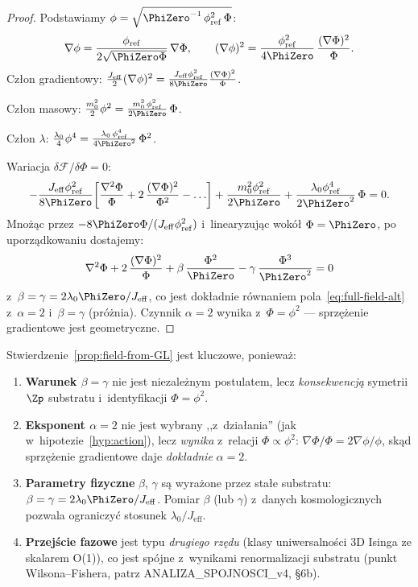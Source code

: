 \begin{proof}
Podstawiamy $\phi = \sqrt{\PhiZero^{-1}\,\phi_{\mathrm{ref}}^2\,\Phi}$:
\[
  \nabla\phi = \frac{\phi_{\mathrm{ref}}}{2\sqrt{\PhiZero\Phi}}\,\nabla\Phi,
  \qquad
  (\nabla\phi)^2 = \frac{\phi_{\mathrm{ref}}^2}{4\PhiZero}\,
    \frac{(\nabla\Phi)^2}{\Phi}.
\]
Cz\l{}on gradientowy:
$\frac{J_{\mathrm{eff}}}{2}(\nabla\phi)^2
= \frac{J_{\mathrm{eff}}\phi_{\mathrm{ref}}^2}{8\PhiZero}
  \frac{(\nabla\Phi)^2}{\Phi}$.

Cz\l{}on masowy:
$\frac{m_0^2}{2}\phi^2
= \frac{m_0^2\,\phi_{\mathrm{ref}}^2}{2\PhiZero}\,\Phi$.

Cz\l{}on $\lambda$:
$\frac{\lambda_0}{4}\phi^4
= \frac{\lambda_0\,\phi_{\mathrm{ref}}^4}{4\PhiZero^2}\,\Phi^2$.

Wariacja $\delta\mathcal{F}/\delta\Phi = 0$:
\[
  -\frac{J_{\mathrm{eff}}\phi_{\mathrm{ref}}^2}{8\PhiZero}\!\left[
    \frac{\nabla^2\Phi}{\Phi}
    + 2\,\frac{(\nabla\Phi)^2}{\Phi^2} - \ldots
  \right]
  + \frac{m_0^2\phi_{\mathrm{ref}}^2}{2\PhiZero}
  + \frac{\lambda_0\phi_{\mathrm{ref}}^4}{2\PhiZero^2}\,\Phi
  = 0.
\]
Mno\.z\k{a}c przez $-8\PhiZero\Phi/(J_{\mathrm{eff}}\phi_{\mathrm{ref}}^2)$
i~linearyzuj\k{a}c wok\'o\l{} $\Phi = \PhiZero$, po uporz\k{a}dkowaniu
dostajemy:
\[
  \nabla^2\Phi + 2\,\frac{(\nabla\Phi)^2}{\Phi}
  + \beta\,\frac{\Phi^2}{\PhiZero}
  - \gamma\,\frac{\Phi^3}{\PhiZero^2} = 0
\]
z~$\beta = \gamma = 2\lambda_0\PhiZero/J_{\mathrm{eff}}$,
co jest dok\l{}adnie r\'ownaniem pola~\eqref{eq:full-field-alt}
z~$\alpha = 2$ i~$\beta = \gamma$ (pr\'o\.znia).
Czynnik $\alpha = 2$ wynika z~$\Phi = \phi^2$ ---
sprz\k{e}\.zenie gradientowe jest geometryczne.
\end{proof}

\begin{remark}\label{rem:GL-physics}
Stwierdzenie~\ref{prop:field-from-GL} jest kluczowe,
poniewa\.z:
\begin{enumerate}[nosep]
  \item \textbf{Warunek $\beta = \gamma$} nie jest
    niezale\.znym postulatem, lecz \emph{konsekwencj\k{a}}
    symetrii $\Zp$ substratu i~identyfikacji $\Phi = \phi^2$.
  \item \textbf{Eksponent $\alpha = 2$} nie jest wybrany
    ,,z~dzia\l{}ania'' (jak w~hipotezie~\ref{hyp:action}),
    lecz \emph{wynika} z~relacji $\Phi \propto \phi^2$:
    $\nabla\Phi/\Phi = 2\nabla\phi/\phi$,
    sk\k{a}d sprz\k{e}\.zenie gradientowe daje
    \emph{dok\l{}adnie} $\alpha = 2$.
  \item \textbf{Parametry fizyczne} $\beta$, $\gamma$
    s\k{a} wyra\.zone przez sta\l{}e substratu:
    $\beta = \gamma = 2\lambda_0\PhiZero/J_{\mathrm{eff}}$.
    Pomiar $\beta$ (lub $\gamma$) z~danych kosmologicznych
    pozwala ograniczy\'c stosunek $\lambda_0/J_{\mathrm{eff}}$.
  \item \textbf{Przej\'scie fazowe} jest typu \emph{drugiego rz\k{e}du}
    (klasy uniwersalno\'sci 3D Isinga ze skalarem O(1)),
    co jest sp\'ojne z~wynikami renormalizacji substratu
    (punkt Wilsona--Fishera, patrz ANALIZA\_SPOJNOSCI\_v4,
    \S6b).
\end{enumerate}
\end{remark}


